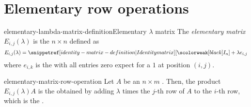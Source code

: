 \documentclass[preview]{standalone}
\begin{document}
\genpage

\section{Elementary row operations}



\begin{snippetdefinition}{elementary-lambda-matrix-definition}{Elementary \(\lambda\) matrix}
    The \emph{elementary matrix} \(E_{i,j}(\lambda)\) is the \(n\times n\) \matrix defined as
    \[
        E_{i,j}(\lambda) = \identmatrix{n} + \lambda e_{i,j}
    \]
    where \(e_{i,k}\) is the \matrix with all entries zero expect for a \(1\) at position \((i,j)\).
\end{snippetdefinition}

\begin{snippetproposition}{elementary-matrix-row-operation}{}
    Let \(A\) be an \(n\times m\) \matrix. Then, the product \(E_{i,j}(\lambda)A\) is the \matrix obtained by
    adding \(\lambda\) times the \(j\)-th row of \(A\) to the \(i\)-th row, which is the
    .
\end{snippetproposition}
\end{document}
